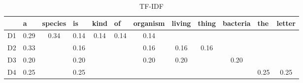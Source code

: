 \begin{itemize}
	\begin{table}[H]
		\centering
		\caption{TF-IDF}
		\label{tf_idf}
		\begin{tabular}{@{}lccccccccccc@{}}
			\toprule
			& \multicolumn{1}{l}{a} & \multicolumn{1}{l}{species} & \multicolumn{1}{l}{is} & \multicolumn{1}{l}{kind} & \multicolumn{1}{l}{of} & \multicolumn{1}{l}{organism} & \multicolumn{1}{l}{living} & \multicolumn{1}{l}{thing} & \multicolumn{1}{l}{bacteria} & \multicolumn{1}{l}{the} & \multicolumn{1}{l}{letter} \\ \midrule
			D1 & 0.29                  & 0.34                        & 0.14                   & 0.14                     & 0.14                   & 0.14                         &                            &                           &                              &                         &                            \\
			D2 & 0.33                  &                             & 0.16                   &                          &                        & 0.16                         & 0.16                       & 0.16                      &                              &                         &                            \\
			D3 & 0.20                  &                             & 0.20                   &                          &                        & 0.20                         & 0.20                       &                           & 0.20                         &                         &                            \\
			D4 & 0.25                  &                             & 0.25                   &                          &                        &                              &                            &                           &                              & 0.25                    & 0.25                       \\ \bottomrule
		\end{tabular}
	\end{table}
	
\end{itemize}

